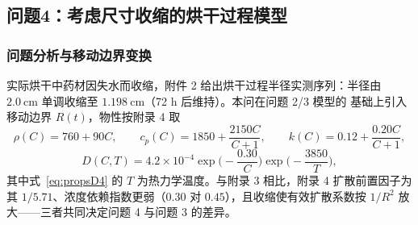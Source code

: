 \subsection{问题4：考虑尺寸收缩的烘干过程模型}

\subsubsection{问题分析与移动边界变换}

实际烘干中药材因失水而收缩，附件 2 给出烘干过程半径实测序列：半径由
$2.0\ \mathrm{cm}$ 单调收缩至 $1.198\ \mathrm{cm}$（72 h 后维持）。本问在问题 2/3 模型的
基础上引入移动边界 $R(t)$，物性按附录 4 取
\begin{equation}
  \rho(C)=760+90C,\qquad
  c_p(C)=1850+\frac{2150C}{C+1},\qquad
  k(C)=0.12+\frac{0.20C}{C+1},
  \label{eq:props4}
\end{equation}
\begin{equation}
  D(C,T)=4.2\times10^{-4}\exp\Big(-\frac{0.30}{C}\Big)\exp\Big(-\frac{3850}{T}\Big),
  \label{eq:propsD4}
\end{equation}
其中式~\eqref{eq:propsD4} 的 $T$ 为热力学温度。与附录 3 相比，附录 4 扩散前置因子为
其 $1/5.71$、浓度依赖指数更弱（$0.30$ 对 $0.45$），且收缩使有效扩散系数按 $1/R^2$
放大——三者共同决定问题 4 与问题 3 的差异。

